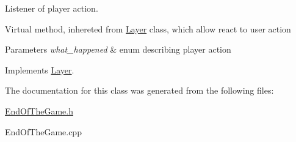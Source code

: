 Listener of player action. 

Virtual method, inhereted from \hyperlink{class_layer}{Layer} class, which allow react to user action 
\begin{DoxyParams}{Parameters}
{\em what\+\_\+happened} & enum describing player action \\
\hline
\end{DoxyParams}


Implements \hyperlink{class_layer}{Layer}.



The documentation for this class was generated from the following files\+:\begin{DoxyCompactItemize}
\item 
\hyperlink{_end_of_the_game_8h}{End\+Of\+The\+Game.\+h}\item 
End\+Of\+The\+Game.\+cpp\end{DoxyCompactItemize}
